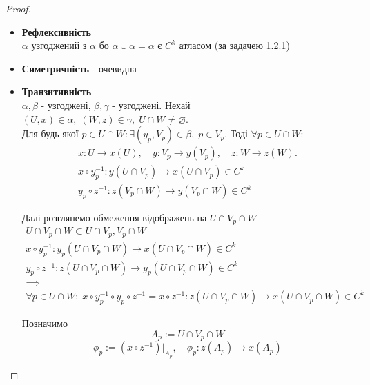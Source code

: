 \documentclass[10pt, a4paper]{article} %
\begin{document}
\begin{proof}
    \begin{itemize}
        \item \textbf{Рефлексивність}\\
        $\alpha$ узгоджений з $\alpha$ бо $\alpha\cup\alpha=\alpha$ є $C^k$ атласом (за задачею 1.2.1)
        \item \textbf{Симетричність} - очевидна
        \item \textbf{Транзитивність}\\
        $\alpha,\beta$ - узгоджені, $\beta,\gamma$ - узгоджені.
        Нехай $(U,x)\in\alpha, \; (W,z)\in\gamma, \; U\cap W \ne \varnothing$. \\
        

        Для будь якої $p \in U\cap W: \exists (y_p, V_p) \in \beta, \; p\in V_p$.
        Тоді $\forall p \in U\cap W:$
        \begin{gather*}
            x : U \to x(U), \quad y : V_p \to y(V_p), \quad z : W \to z(W).\\
            x \circ y_p^{-1} : y(U\cap V_p) \to x(U\cap V_p) \in C^k\\
            y_p \circ z^{-1} : z(V_p\cap W) \to y(V_p\cap W) \in C^k
        \end{gather*}

        Далі розглянемо обмеження відображень на $U\cap V_p \cap W$
        \begin{gather*}
            U\cap V_p\cap W \subset U\cap V_p, V_p\cap W\\
            x \circ y_p^{-1} : y_p(U\cap V_p\cap W) \to x(U\cap V_p\cap W) \in C^k\\
            y_p \circ z^{-1} : z(U\cap V_p\cap W) \to y_p(U\cap V_p\cap W) \in C^k\\
            \implies\\
            \forall p\in U\cap W:\; x \circ y_p^{-1} \circ y_p \circ z^{-1} = x \circ z^{-1} : z(U\cap V_p\cap W) \to x(U\cap V_p\cap W) \in C^k
        \end{gather*}

        Позначимо 
        \[A_p := U\cap V_p\cap W\]
        \[\phi_p := \left(x \circ z^{-1}\right)|_{A_p}, \quad \phi_p : z(A_p) \to x(A_p) \]
        

\end{itemize}
\end{proof}
\end{document}
